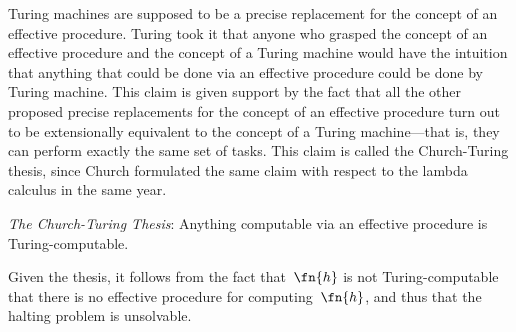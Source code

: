 \documentclass[../../../include/open-logic-section]{subfiles}
\begin{document}

Turing machines are supposed to be a precise replacement for the concept
of an effective procedure. Turing took it that anyone who grasped the
concept
of an effective procedure and the concept of a Turing machine would have
the intuition that anything that could be done via an effective procedure
could be done by Turing machine. This claim is given support by the fact
that all the other proposed precise replacements for the concept of an
effective procedure turn out to be extensionally equivalent to the concept
of a Turing machine---that is, they can perform exactly the same set of
tasks. This claim is called the Church-Turing thesis, since Church
formulated the same claim with respect to the lambda calculus in the same
year.

\begin{defn}
\emph{The Church-Turing Thesis}: Anything computable via an effective
procedure is Turing-computable.
\end{defn}

Given the thesis, it follows from the fact that~$\fn{h}$ is not
Turing-computable that there is no effective procedure for
computing~$\fn{h}$, and thus that the halting problem is unsolvable.
\end{document}
